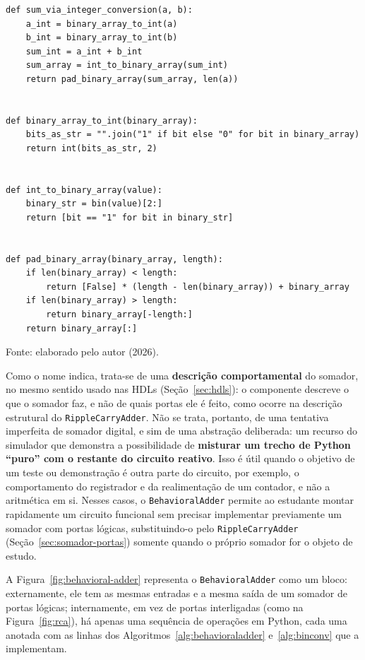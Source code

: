 \begin{algoritmo}[H]
\caption{Funções auxiliares de conversão e \textit{padding} binário (utils/binary\_conversion.py).}
\label{alg:binconv}
\begin{verbatim}
def sum_via_integer_conversion(a, b):
    a_int = binary_array_to_int(a)
    b_int = binary_array_to_int(b)
    sum_int = a_int + b_int
    sum_array = int_to_binary_array(sum_int)
    return pad_binary_array(sum_array, len(a))


def binary_array_to_int(binary_array):
    bits_as_str = "".join("1" if bit else "0" for bit in binary_array)
    return int(bits_as_str, 2)


def int_to_binary_array(value):
    binary_str = bin(value)[2:]
    return [bit == "1" for bit in binary_str]


def pad_binary_array(binary_array, length):
    if len(binary_array) < length:
        return [False] * (length - len(binary_array)) + binary_array
    if len(binary_array) > length:
        return binary_array[-length:]
    return binary_array[:]
\end{verbatim}
\begin{center}
\footnotesize Fonte: elaborado pelo autor (2026).
\end{center}
\end{algoritmo}

Como o nome indica, trata-se de uma \textbf{descrição comportamental} do somador, no mesmo sentido usado nas HDLs (Seção~\ref{sec:hdls}): o componente descreve o que o somador faz, e não de quais portas ele é feito, como ocorre na descrição estrutural do \texttt{RippleCarryAdder}. Não se trata, portanto, de uma tentativa imperfeita de somador digital, e sim de uma abstração deliberada: um recurso do simulador que demonstra a possibilidade de \textbf{misturar um trecho de Python ``puro'' com o restante do circuito reativo}. Isso é útil quando o objetivo de um teste ou demonstração é outra parte do circuito, por exemplo, o comportamento do registrador e da realimentação de um contador, e não a aritmética em si. Nesses casos, o \texttt{BehavioralAdder} permite ao estudante montar rapidamente um circuito funcional sem precisar implementar previamente um somador com portas lógicas, substituindo-o pelo \texttt{RippleCarryAdder} (Seção~\ref{sec:somador-portas}) somente quando o próprio somador for o objeto de estudo.

A Figura~\ref{fig:behavioral-adder} representa o \texttt{BehavioralAdder} como um bloco: externamente, ele tem as mesmas entradas e a mesma saída de um somador de portas lógicas; internamente, em vez de portas interligadas (como na Figura~\ref{fig:rca}), há apenas uma sequência de operações em Python, cada uma anotada com as linhas dos Algoritmos~\ref{alg:behavioraladder} e~\ref{alg:binconv} que a implementam.

